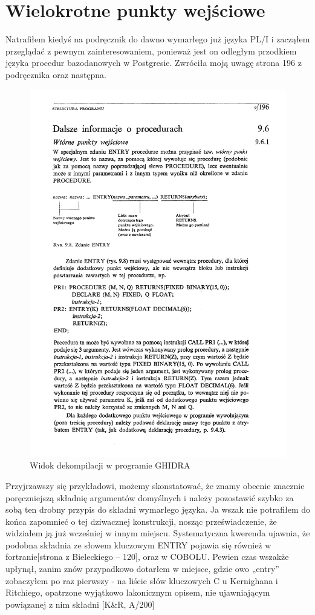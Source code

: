 \section{Wielokrotne punkty wejściowe}
Natrafiłem kiedyś na podręcznik do dawno wymarłego już języka PL/I i zacząłem przeglądać z pewnym zainteresowaniem, ponieważ jest on odległym przodkiem języka procedur bazodanowych w Postgresie. Zwróciła moją uwagę strona 196 z podręcznika\cite{plif} oraz następna.
\begin{figure}[h]
    \centering
    \includegraphics[width=1.3\textwidth]{images/wywod/PLI1_bin.png}
    \caption{Widok dekompilacji w programie GHIDRA}
\end{figure}
Przyjrzawszy się przykładowi, możemy skonstatować, że znamy obecnie znacznie poręczniejszą składnię argumentów domyślnych i należy pozostawić szybko za sobą ten drobny przypis do składni wymarłego języka. Ja wszak nie potrafiłem do końca zapomnieć o tej dziwacznej konstrukcji, nosząc przeświadczenie, że widziałem ją już wcześniej w innym miejscu. Systematyczna kwerenda ujawnia, że podobna składnia ze słowem kluczowym ENTRY pojawia się również w fortranie[strona z Bieleckiego – 120], oraz w COBOLU. Pewien czas wszakże upłynął, zanim znów przypadkowo dotarłem w miejsce, gdzie owo „entry” zobaczyłem po raz pierwszy -  na liście słów kluczowych C u Kernighana i Ritchiego, opatrzone wyjątkowo lakonicznym opisem, nie ujawniającym powiązanej z nim składni [K\&R, A/200]
